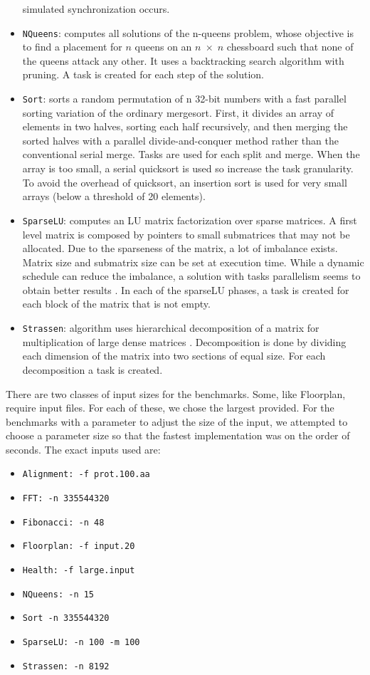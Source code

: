 \documentclass[sigconf]{acmart}
\begin{document}
\begin{itemize}
simulated synchronization   occurs. 
\item \texttt{NQueens}: computes  all  solutions  of  the n-queens
problem, whose objective is to find a placement for $n$ queens on an $n \;
\times \; n$ chessboard such that none of the queens attack any other. It uses
a backtracking search algorithm with pruning. A task is created for each step
of the solution.
\item \texttt{Sort}: sorts a random permutation of n 32-bit numbers with  a
fast  parallel  sorting  variation  \cite{mergesort}  of  the  ordinary
mergesort.  First, it divides an array of elements in two halves, sorting  each
half  recursively,  and  then  merging  the  sorted halves with a parallel
divide-and-conquer method rather than the  conventional  serial  merge.  Tasks
are  used  for  each  split and merge. When the array is too small, a serial
quicksort is used  so increase  the  task  granularity.  To  avoid  the
overhead of  quicksort,  an insertion  sort  is  used  for  very  small  arrays
(below a threshold of 20 elements).
\item \texttt{SparseLU}: computes an LU matrix factorization over
sparse matrices. A first level matrix is composed by pointers to  small
submatrices  that  may  not  be  allocated.  Due  to  the sparseness  of  the
matrix,  a  lot  of  imbalance  exists.  Matrix size and submatrix size can be
set at execution time. While a dynamic schedule can reduce the imbalance, a
solution with tasks parallelism seems to obtain better results \cite{}. In each
of the sparseLU  phases,  a  task  is  created  for  each  block  of  the
matrix that is not empty.
\item \texttt{Strassen}: algorithm  uses  hierarchical  decomposition of a
matrix for multiplication of large dense matrices \cite{}. Decomposition is
done by dividing each dimension of the matrix into  two  sections  of  equal
size. For each decomposition a task is created. 
\end{itemize}

There are two classes of input sizes for the benchmarks. Some, like Floorplan,
require input files. For each of these, we chose the largest provided. For the
benchmarks with a parameter to adjust the size of the input, we attempted to 
choose a parameter size so that the fastest implementation was on the order of
seconds. The exact inputs used are:

\begin{itemize}
\item \texttt{Alignment: -f prot.100.aa} 
\item \texttt{FFT: -n 335544320}
\item \texttt{Fibonacci: -n 48}
\item \texttt{Floorplan: -f input.20}
\item \texttt{Health: -f large.input}
\item \texttt{NQueens: -n 15}
\item \texttt{Sort -n 335544320}
\item \texttt{SparseLU: -n 100 -m 100}
\item \texttt{Strassen: -n 8192}
\end{itemize}
\end{document}
